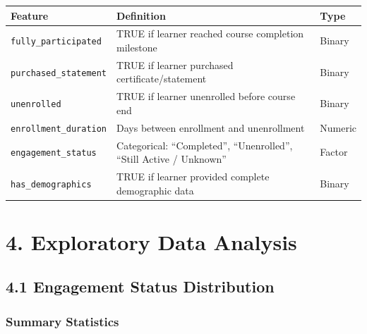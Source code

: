 \documentclass[
]{article}
\newcounter{none} %
\begin{document}
{\def\LTcaptype{none} %
\begin{longtable}[]{@{}
  >{\raggedright\arraybackslash}p{}
  >{\raggedright\arraybackslash}p{}
  >{\raggedright\arraybackslash}p{}@{}}
\toprule\noalign{}
\begin{minipage}[b]{\linewidth}\raggedright
Feature
\end{minipage} & \begin{minipage}[b]{\linewidth}\raggedright
Definition
\end{minipage} & \begin{minipage}[b]{\linewidth}\raggedright
Type
\end{minipage} \\
\midrule\noalign{}
\endhead
\bottomrule\noalign{}
\endlastfoot
\texttt{fully\_participated} & TRUE if learner reached course completion
milestone & Binary \\
\texttt{purchased\_statement} & TRUE if learner purchased
certificate/statement & Binary \\
\texttt{unenrolled} & TRUE if learner unenrolled before course end &
Binary \\
\texttt{enrollment\_duration} & Days between enrollment and unenrollment
& Numeric \\
\texttt{engagement\_status} & Categorical: ``Completed'',
``Unenrolled'', ``Still Active / Unknown'' & Factor \\
\texttt{has\_demographics} & TRUE if learner provided complete
demographic data & Binary \\
\end{longtable}
}

\section{4. Exploratory Data Analysis}\label{exploratory-data-analysis}

\subsection{4.1 Engagement Status
Distribution}\label{engagement-status-distribution}

\subsubsection{Summary Statistics}\label{summary-statistics}
\end{document}
